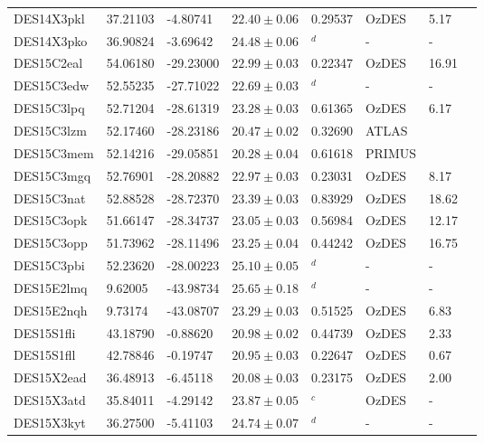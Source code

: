 \documentclass[fleqn,usenatbib,]{mnras}
\begin{document}
\begin{table}
\begin{threeparttable}
\begin{tabular}{llllllll}
DES14X3pkl     & 37.21103 &  -4.80741 & $22.40 \pm 0.06$ & 0.29537 &      OzDES &       5.17 \\
DES14X3pko     & 36.90824 &  -3.69642 & $24.48 \pm 0.06$ &    $^d$ &          - &             - \\
DES15C2eal     & 54.06180 & -29.23000 & $22.99 \pm 0.03$ & 0.22347 &      OzDES &      16.91 \\
DES15C3edw     & 52.55235 & -27.71022 & $22.69 \pm 0.03$ &    $^d$ &          - &             - \\
DES15C3lpq     & 52.71204 & -28.61319 & $23.28 \pm 0.03$ & 0.61365 &      OzDES &       6.17 \\
DES15C3lzm     & 52.17460 & -28.23186 & $20.47 \pm 0.02$ & 0.32690 &      ATLAS &               \\
DES15C3mem\tnote{e}     & 52.14216 & -29.05851 & $20.28 \pm 0.04$ & 0.61618 &     PRIMUS &               \\
DES15C3mgq     & 52.76901 & -28.20882 & $22.97 \pm 0.03$ & 0.23031 &      OzDES &       8.17 \\
DES15C3nat     & 52.88528 & -28.72370 & $23.39 \pm 0.03$ & 0.83929 &      OzDES &      18.62 \\
DES15C3opk     & 51.66147 & -28.34737 & $23.05 \pm 0.03$ & 0.56984 &      OzDES &      12.17 \\
DES15C3opp     & 51.73962 & -28.11496 & $23.25 \pm 0.04$ & 0.44242 &      OzDES &      16.75 \\
DES15C3pbi     & 52.23620 & -28.00223 & $25.10 \pm 0.05$ &    $^d$ &          - &             - \\
DES15E2lmq     &  9.62005 & -43.98734 & $25.65 \pm 0.18$ &    $^d$ &          - &             - \\
DES15E2nqh     &  9.73174 & -43.08707 & $23.29 \pm 0.03$ & 0.51525 &      OzDES &       6.83 \\
DES15S1fli     & 43.18790 &  -0.88620 & $20.98 \pm 0.02$ & 0.44739 &      OzDES &       2.33 \\
DES15S1fll     & 42.78846 &  -0.19747 & $20.95 \pm 0.03$ & 0.22647 &      OzDES &       0.67 \\
DES15X2ead     & 36.48913 &  -6.45118 & $20.08 \pm 0.03$ & 0.23175 &      OzDES &       2.00 \\
DES15X3atd     & 35.84011 &  -4.29142 & $23.87 \pm 0.05$ &    $^c$ &      OzDES &             - \\
DES15X3kyt     & 36.27500 &  -5.41103 & $24.74 \pm 0.07$ &    $^d$ &          - &             - \\


\end{tabular}
\end{threeparttable}
\end{table}
\end{document}
